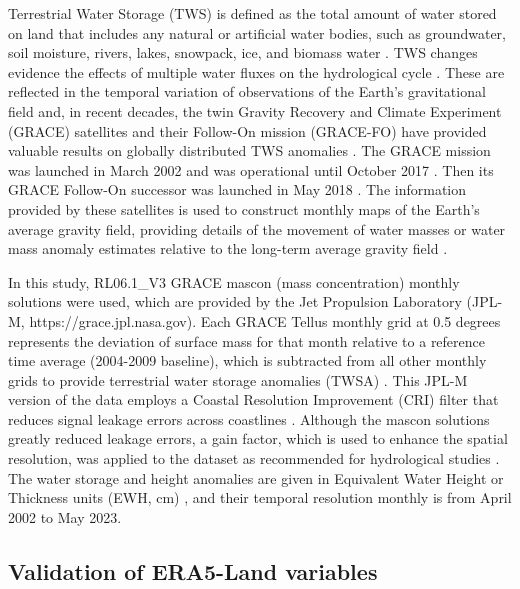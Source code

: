\documentclass[
  number,
  preprint,
  3p]{elsarticle}
\begin{document}
Terrestrial Water Storage (TWS) is defined as the total amount of water
stored on land that includes any natural or artificial water bodies,
such as groundwater, soil moisture, rivers, lakes, snowpack, ice, and
biomass water \citep{Humphrey2023, Deng2023}. TWS changes evidence the
effects of multiple water fluxes on the hydrological cycle
\citep{Deng2023}. These are reflected in the temporal variation of
observations of the Earth's gravitational field
\citep{Abolafia2021, Sabzehee2023} and, in recent decades, the twin
Gravity Recovery and Climate Experiment (GRACE) satellites and their
Follow-On mission (GRACE-FO) have provided valuable results on globally
distributed TWS anomalies \citep{Tapley2019, Ferreira2023}. The GRACE
mission was launched in March 2002 and was operational until October
2017 \citep{Ramjeawon2022}. Then its GRACE Follow-On successor was
launched in May 2018 \citep{Landerer2020, Yin2022}. The information
provided by these satellites is used to construct monthly maps of the
Earth's average gravity field, providing details of the movement of
water masses or water mass anomaly estimates relative to the long-term
average gravity field \citep{Humphrey2023, Wahr2004}.

In this study, RL06.1\_V3 GRACE mascon (mass concentration) monthly
solutions were used, which are provided by the Jet Propulsion Laboratory
(JPL-M, https://grace.jpl.nasa.gov). Each GRACE Tellus monthly grid at
0.5 degrees represents the deviation of surface mass for that month
relative to a reference time average (2004-2009 baseline), which is
subtracted from all other monthly grids to provide terrestrial water
storage anomalies (TWSA) \citep{Ramjeawon2022, Yin2022}. This JPL-M
version of the data employs a Coastal Resolution Improvement (CRI)
filter that reduces signal leakage errors across coastlines
\citep{NASA2019, Wiese2016}. Although the mascon solutions greatly
reduced leakage errors, a gain factor, which is used to enhance the
spatial resolution, was applied to the dataset as recommended for
hydrological studies \citep{Ramjeawon2022, Yin2022}. The water storage
and height anomalies are given in Equivalent Water Height or Thickness
units (EWH, cm) \citep{Sabzehee2023}, and their temporal resolution
monthly is from April 2002 to May 2023.

\hypertarget{validation-of-era5-land-variables}{%
\subsection{Validation of ERA5-Land
variables}\label{validation-of-era5-land-variables}}
\end{document}
